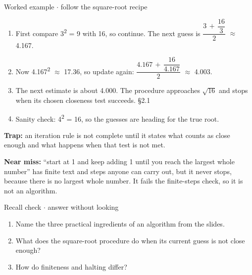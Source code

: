 \documentclass[11pt]{article}
\begin{document}
\begin{keepsection}
\begin{keepsection}
\begin{workedbox}{Worked example \ensuremath{\cdot} follow the square-root recipe}
\begin{enumerate}
\item First compare 3\textsuperscript{2} = 9 with 16, so continue. The next guess is {\small\ensuremath{\dfrac{3\, +\, \dfrac{16}{3}}{2}}} \ensuremath{\approx} 4.167.
\item Now 4.167\textsuperscript{2} \ensuremath{\approx} 17.36, so update again: {\small\ensuremath{\dfrac{4.167\, +\, \dfrac{16}{4.167}}{2}}} \ensuremath{\approx} 4.003.
\item The next estimate is about 4.000. The procedure approaches \ensuremath{\sqrt{16}} and stops when its chosen closeness test succeeds. \hfill{\small\color{FAUblue}§2.1}
\item Sanity check: 4\textsuperscript{2} = 16, so the guesses are heading for the true root.
\end{enumerate}
\end{workedbox}

\begin{notebox}\textbf{Trap:} an iteration rule is not complete until it states what counts as close enough and what happens when that test is not met.\end{notebox}

\begin{notebox}\textbf{Near miss:} “start at 1 and keep adding 1 until you reach the largest whole number” has finite text and steps anyone can carry out, but it never stops, because there is no largest whole number. It fails the finite-steps check, so it is not an algorithm.\end{notebox}

\begin{recallbox}{Recall check \ensuremath{\cdot} answer without looking}
\begin{enumerate}
\item Name the three practical ingredients of an algorithm from the slides.
\item What does the square-root procedure do when its current guess is not close enough?
\item How do finiteness and halting differ?
\end{enumerate}

\end{recallbox}
\end{keepsection}
\end{keepsection}
\end{document}
